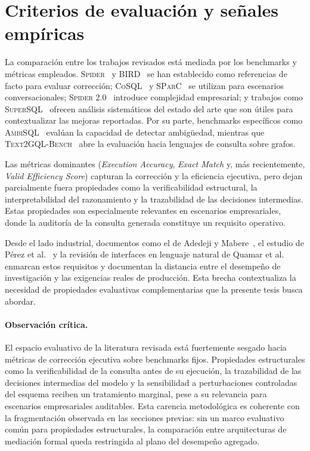 \section{Criterios de evaluación y señales empíricas}
\label{sec:sota-evaluacion}

La comparación entre los trabajos revisados está mediada por los benchmarks
y métricas empleados. \textsc{Spider}~\cite{Spider2018} y
\textsc{BIRD}~\cite{BIRD2023} se han establecido como referencias de facto para evaluar corrección;
\textsc{CoSQL}~\cite{CoSQL2019} y \textsc{SParC}~\cite{SParC2019} se
utilizan para escenarios conversacionales; \textsc{Spider 2.0}~%
\cite{spider2_2025} introduce complejidad empresarial; y trabajos como
\textsc{SuperSQL}~\cite{SuperSQL2024} ofrecen análisis sistemáticos del
estado del arte que son útiles para contextualizar las mejoras reportadas.
Por su parte, benchmarks específicos como \textsc{AmbiSQL}~\cite{AmbiSQL}
evalúan la capacidad de detectar ambigüedad, mientras que
\textsc{Text2GQL-Bench}~\cite{text2gqlbench} abre la evaluación hacia
lenguajes de consulta sobre grafos.

Las métricas dominantes (\emph{Execution Accuracy}, \emph{Exact Match} y,
más recientemente, \emph{Valid Efficiency Score}) capturan la corrección y
la eficiencia ejecutiva, pero dejan parcialmente fuera propiedades como la
verificabilidad estructural, la interpretabilidad del razonamiento y la
trazabilidad de las decisiones intermedias. Estas propiedades son
especialmente relevantes en escenarios empresariales, donde la auditoría
de la consulta generada constituye un requisito operativo.

Desde el lado industrial, documentos como el de Adedeji y
Mabere~\cite{Data2Decisions}, el estudio de Pérez et al.~\cite{llm-insight}
y la revisión de interfaces en lenguaje natural de Quamar et
al.~\cite{NLinterfaces} enmarcan estos requisitos y documentan la distancia
entre el desempeño de investigación y las exigencias reales de producción.
Esta brecha contextualiza la necesidad de propiedades evaluativas
complementarias que la presente tesis busca abordar.

\paragraph{Observación crítica.} El espacio evaluativo de la literatura
revisada está fuertemente sesgado hacia métricas de corrección ejecutiva
sobre benchmarks fijos. Propiedades estructurales como la
verificabilidad de la consulta antes de su ejecución, la trazabilidad de
las decisiones intermedias del modelo y la sensibilidad a perturbaciones
controladas del esquema reciben un tratamiento marginal, pese a su
relevancia para escenarios empresariales auditables. Esta carencia
metodológica es coherente con la fragmentación observada en las secciones
previas: sin un marco evaluativo común para propiedades estructurales, la
comparación entre arquitecturas de mediación formal queda restringida al
plano del desempeño agregado.

